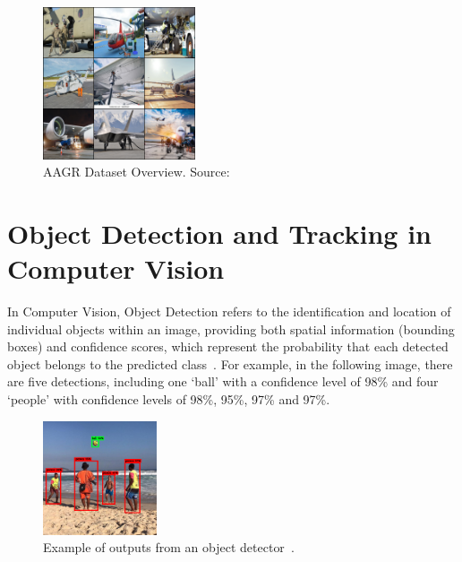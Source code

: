 \documentclass[12pt,oneside]{book} %
\begin{document}
\begin{figure}[H]
    \centering
    \includegraphics[width=0.4\textwidth]{figures/AGRDatasetGrid.png}
    \caption{AAGR Dataset Overview. Source: \citet{DatasetAGR}}\label{fig:agr-dataset}
\end{figure}


\newpage
\section{Object Detection and Tracking in Computer Vision}
In Computer Vision, Object Detection refers to the identification and location
of individual objects within an image, providing both spatial information
(bounding boxes) and confidence scores, which represent the probability that
each detected object belongs to the predicted
class~\cite{huggingface2023objectdetection}. For example, in the following
image, there are five detections, including one `ball' with a confidence level
of 98\% and four `people' with confidence levels of 98\%, 95\%, 97\% and 97\%.

\begin{figure}[H]
    \centering
    \includegraphics[width=0.3\textwidth]{figures/intro_object_detection.png}
    \caption{Example of outputs from an object detector~\cite{huggingface2023objectdetection}.}\label{fig:object-detection}
\end{figure}
\end{document}

